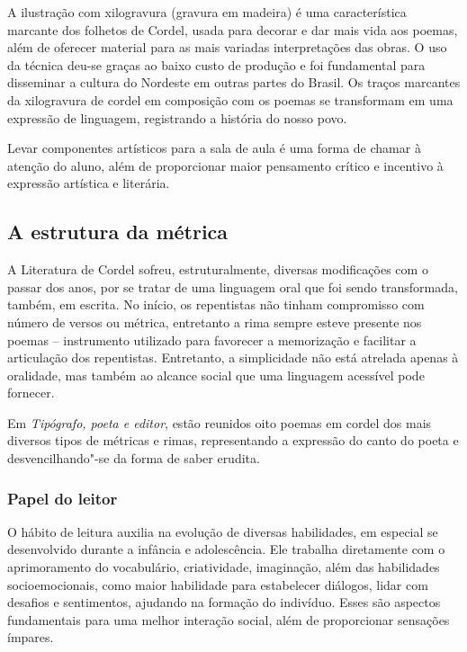 \documentclass[12pt]{extarticle}
\begin{document}
A ilustração com xilogravura (gravura em madeira) é uma característica marcante
dos folhetos de Cordel, usada para decorar e dar mais vida aos poemas, além de
oferecer material para as mais variadas interpretações das obras. O uso da
técnica deu-se graças ao baixo custo de produção e foi fundamental para
disseminar a cultura do Nordeste em outras partes do Brasil. Os traços
marcantes da xilogravura de cordel em composição com os poemas se transformam
em uma expressão de linguagem, registrando a história do nosso povo.

Levar componentes artísticos para a sala de aula é uma forma de chamar
à atenção do aluno, além de proporcionar maior pensamento crítico e incentivo
à expressão artística e literária.


\subsection{A estrutura da métrica}

A Literatura de Cordel sofreu, estruturalmente, diversas modificações com
o passar dos anos, por se tratar de uma linguagem oral que foi sendo
transformada, também, em escrita. No início, os repentistas não tinham
compromisso com número de versos ou métrica, entretanto a rima sempre esteve
presente nos poemas -- instrumento utilizado para favorecer a memorização
e facilitar a articulação dos repentistas. Entretanto, a simplicidade não está
atrelada apenas à oralidade, mas também ao alcance social que uma linguagem
acessível pode fornecer.

Em \emph{Tipógrafo, poeta e editor}, estão reunidos oito poemas em cordel dos 
mais diversos tipos de métricas e rimas, representando a expressão do canto 
do poeta e desvencilhando"-se da forma de saber erudita.

\subsubsection{Papel do leitor}

O hábito de leitura auxilia na evolução de diversas habilidades, em especial se
desenvolvido durante a infância e adolescência. Ele trabalha diretamente com
o aprimoramento do vocabulário, criatividade, imaginação, além das habilidades
socioemocionais, como maior habilidade para estabelecer diálogos, lidar com
desafios e sentimentos, ajudando na formação do indivíduo. Esses são aspectos
fundamentais para uma melhor interação social, além de proporcionar sensações
ímpares.
\end{document}
